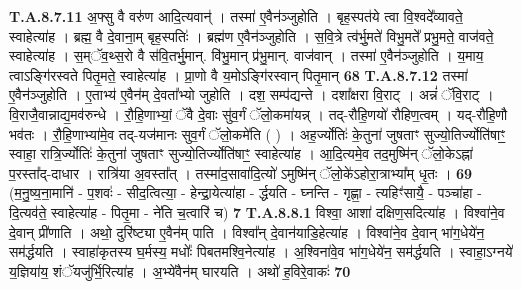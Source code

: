 \documentclass[17pt]{extarticle}
\begin{document}
                  \newline
                                                                  \textbf{ T.A.8.7.11} \newline
                  अ॒फ्सु वै वरु॑ण आदि॒त्यवान्॑ । तस्मा॑ ए॒वैन॑ञ्जुहोति ।  बृह॒स्पत॑ये त्वा वि॒श्वदे᳚व्यावते॒ स्वाहेत्या॑ह ।  ब्रह्म॒ वै दे॒वाना॒म् बृह॒स्पतिः॑ ।  ब्रह्म॑ण ए॒वैन॑ञ्जुहोति ।  स॒वि॒त्रे त्व॑र्भु॒मते॑ विभु॒मते᳚ प्रभु॒मते॒ वाज॑वते॒ स्वाहेत्या॑ह । स॒म्ॅव॒थ्स॒रो वै स॑वि॒तर्भु॒मान्. वि॑भु॒मान् प्र॑भु॒मान्. वाज॑वान् । तस्मा॑ ए॒वैन॑ञ्जुहोति । य॒माय॒ त्वाऽङ्गि॑रस्वते पितृ॒मते॒ स्वाहेत्या॑ह ।  प्रा॒णो वै य॒मोऽङ्गि॑रस्वान् पितृ॒मान् \textbf{ 68} \newline
                  \newline
                                                                  \textbf{ T.A.8.7.12} \newline
                  तस्मा॑ ए॒वैन॑ञ्जुहोति । ए॒ताभ्य॑ ए॒वैन॑म् दे॒वता᳚भ्यो जुहोति । दश॒ सम्प॑द्यन्ते । दशा᳚क्षरा वि॒राट् । अन्नं॑ ॅवि॒राट् । वि॒राजै॒वान्नाद्य॒मव॑रुन्धे । रौ॒हि॒णाभ्यां॒ ॅवै दे॒वाः सु॑व॒र्गं ॅलो॒कमा॑यन्न् । तद्-रौ॑हि॒णयो॑ रौहिण॒त्वम् । यद्-रौ॑हि॒णौ भव॑तः । रौ॒हि॒णाभ्या॑मे॒व तद्-यज॑मानः सुव॒र्गं ॅलो॒कमे॑ति ( ) ।  अह॒र्ज्योतिः॑ के॒तुना॑ जुषताꣳ सुज्यो॒तिर्ज्योति॑षाꣳ॒॒ स्वाहा॒ रात्रि॒र्ज्योतिः॑ के॒तुना॑ जुषताꣳ सुज्यो॒तिर्ज्योति॑षाꣳ॒॒ स्वाहेत्या॑ह ।  आ॒दि॒त्यमे॒व तद॒मुष्मि॑न् ॅलो॒केऽह्ना॑ प॒रस्ता᳚द्-दाधार । रात्रि॑या अ॒वस्ता᳚त् ।  तस्मा॑द॒सावा॑दि॒त्यो॑ ऽमुष्मि॑न् ॅलो॒के॑ऽहोरा॒त्राभ्या᳚म् धृ॒तः । \textbf{ 69} \newline
                  \newline
                                                        (म॒नु॒ष्य॒ना॒मानि॑ - प॒शवः॑ - सीद॒त्वित्या॒ - हेन्द्रा॒येत्या॑हा - र्द्धयति - घ्नन्ति - गृह्णा॒ - त्यहिꣳ॑सायै॒ - पञ्चा॑हा - दि॒त्यव॑ते॒ स्वाहेत्या॑ह - पितृ॒मा - ने॑ति च॒त्वारि॑ च) \textbf{7} \newline \newline
                                \textbf{ T.A.8.8.1} \newline
                  विश्वा॒ आशा॑ दक्षिण॒सदित्या॑ह । विश्वा॑ने॒व दे॒वान् प्री॑णाति । अथो॒ दुरि॑ष्ट्या ए॒वैन॑म् पाति । विश्वा᳚न् दे॒वान॑याडि॒हेत्या॑ह । विश्वा॑ने॒व दे॒वान् भा॑ग॒धेये॑न॒ सम॑र्द्धयति । स्वाहा॑कृतस्य घ॒र्मस्य॒ मधोः᳚ पिबतमश्वि॒नेत्या॑ह ।  अ॒श्विना॑वे॒व भा॑ग॒धेये॑न॒ सम॑र्द्धयति ।  स्वाहा॒ऽग्नये॑ य॒ज्ञिया॑य॒ शंॅयजु॑र्भि॒रित्या॑ह । अ॒भ्ये॑वैन॑म् घारयति । अथो॑ ह॒विरे॒वाकः॑ \textbf{ 70} \newline
                  \newline
\end{document}
